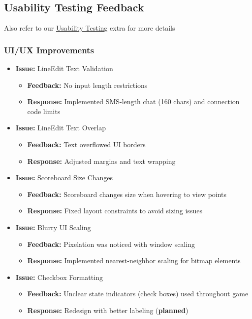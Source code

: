 \documentclass{article}
\begin{document}
\subsection{Usability Testing Feedback}

Also refer to our \href{../Extras/UsabilityTesting/UsabilityTesting.pdf}{Usability Testing} extra for more details

\subsubsection{UI/UX Improvements}
\begin{itemize}
    \item \textbf{Issue:} LineEdit Text Validation
    \begin{itemize}
        \item \textbf{Feedback:} No input length restrictions
        \item \textbf{Response:} Implemented SMS-length chat (160 chars) and connection code limits
    \end{itemize}
    
    \item \textbf{Issue:} LineEdit Text Overlap
    \begin{itemize}
        \item \textbf{Feedback:} Text overflowed UI borders
        \item \textbf{Response:} Adjusted margins and text wrapping
    \end{itemize}
    
    \item \textbf{Issue:} Scoreboard Size Changes
    \begin{itemize}
        \item \textbf{Feedback:} Scoreboard changes size when hovering to view points
        \item \textbf{Response:} Fixed layout constraints to avoid sizing issues
    \end{itemize}
    
    \item \textbf{Issue:} Blurry UI Scaling
    \begin{itemize}
        \item \textbf{Feedback:} Pixelation was noticed with window scaling
        \item \textbf{Response:} Implemented nearest-neighbor scaling for bitmap elements
    \end{itemize}
    
    \item \textbf{Issue:} Checkbox Formatting
    \begin{itemize}
        \item \textbf{Feedback:} Unclear state indicators (check boxes) used throughout game
        \item \textbf{Response:} Redesign with better labeling (\textbf{planned})
    \end{itemize}
\end{itemize}
\end{document}

